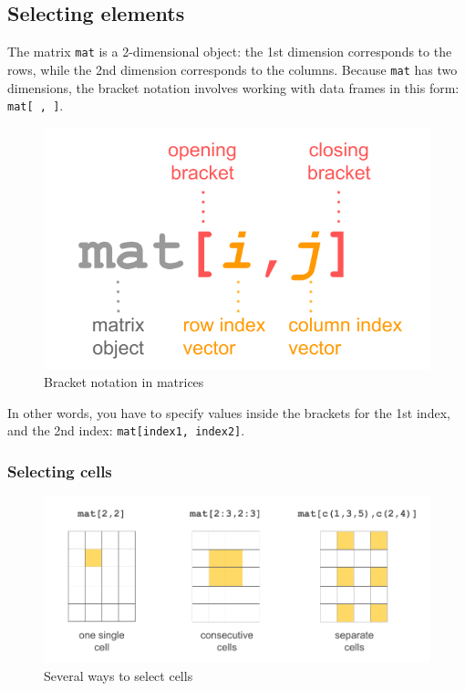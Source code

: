 \documentclass[
]{book}
\begin{document}
\hypertarget{selecting-elements}{%
\subsection{Selecting elements}\label{selecting-elements}}

The matrix \texttt{mat} is a 2-dimensional object: the 1st dimension corresponds
to the rows, while the 2nd dimension corresponds to the columns.
Because \texttt{mat} has two dimensions, the bracket notation involves
working with data frames in this form: \texttt{mat{[}\ ,\ {]}}.

\begin{figure}

{\centering \includegraphics[width=0.5\linewidth]{images/objects/obj-matrix-brackets} 

}

\caption{Bracket notation in matrices}\label{fig:unnamed-chunk-125}
\end{figure}

In other words, you have to specify values inside the
brackets for the 1st index, and the 2nd index: \texttt{mat{[}index1,\ index2{]}}.

\hypertarget{selecting-cells}{%
\subsubsection*{Selecting cells}\label{selecting-cells}}

\begin{figure}

{\centering \includegraphics[width=0.8\linewidth]{images/objects/obj-matrix-cells1} 

}

\caption{Several ways to select cells}\label{fig:unnamed-chunk-126}
\end{figure}
\end{document}
